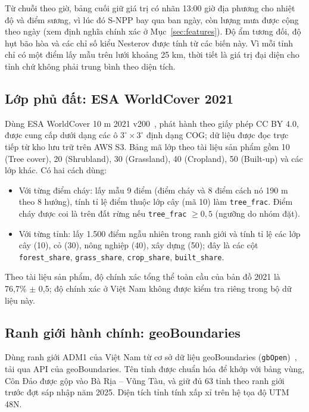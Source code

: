 \documentclass[12pt,a4paper]{article}
\begin{document}
Từ chuỗi theo giờ, bảng cuối giữ giá trị có nhãn 13:00 giờ địa phương cho nhiệt độ và điểm sương, vì lúc đó S-NPP bay qua ban ngày, còn lượng mưa được cộng theo ngày (xem định nghĩa chính xác ở Mục~\ref{sec:features}). Độ ẩm tương đối, độ hụt bão hòa và các chỉ số kiểu Nesterov được tính từ các biến này. Vì mỗi tỉnh chỉ có một điểm lấy mẫu trên lưới khoảng 25 km, thời tiết là giá trị đại diện cho tỉnh chứ không phải trung bình theo diện tích.

\subsection{Lớp phủ đất: ESA WorldCover 2021}\label{sec:worldcover}

Dùng ESA WorldCover 10 m 2021 v200~\cite{zanaga2022}, phát hành theo giấy phép CC BY 4.0, được cung cấp dưới dạng các ô $3^\circ \times 3^\circ$ định dạng COG; dữ liệu được đọc trực tiếp từ kho lưu trữ trên AWS S3. Bảng mã lớp theo tài liệu sản phẩm gồm 10 (Tree cover), 20 (Shrubland), 30 (Grassland), 40 (Cropland), 50 (Built-up) và các lớp khác. Có hai cách dùng:
\begin{itemize}
\item Với từng điểm cháy: lấy mẫu 9 điểm (điểm cháy và 8 điểm cách nó 190 m theo 8 hướng), tính tỉ lệ điểm thuộc lớp cây (mã 10) làm \texttt{tree\_frac}. Điểm cháy được coi là trên đất rừng nếu \texttt{tree\_frac} $\ge 0{,}5$ (ngưỡng do nhóm đặt).
\item Với từng tỉnh: lấy 1.500 điểm ngẫu nhiên trong ranh giới và tính tỉ lệ các lớp cây (10), cỏ (30), nông nghiệp (40), xây dựng (50); đây là các cột \texttt{forest\_share}, \texttt{grass\_share}, \texttt{crop\_share}, \texttt{built\_share}.
\end{itemize}
Theo tài liệu sản phẩm, độ chính xác tổng thể toàn cầu của bản đồ 2021 là 76,7\% $\pm$ 0,5; độ chính xác ở Việt Nam không được kiểm tra riêng trong bộ dữ liệu này.

\subsection{Ranh giới hành chính: geoBoundaries}

Dùng ranh giới ADM1 của Việt Nam từ cơ sở dữ liệu geoBoundaries (\texttt{gbOpen})~\cite{runfola2020}, tải qua API của geoBoundaries. Tên tỉnh được chuẩn hóa để khớp với bảng vùng, Côn Đảo được gộp vào Bà Rịa -- Vũng Tàu, và giữ đủ 63 tỉnh theo ranh giới trước đợt sáp nhập năm 2025. Diện tích tỉnh tính xấp xỉ trên hệ tọa độ UTM 48N.
\end{document}
